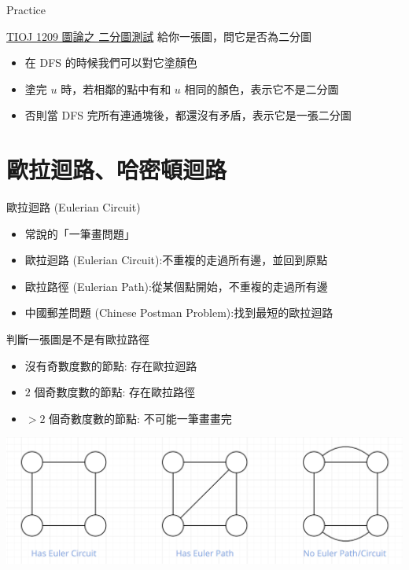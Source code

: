 \documentclass[aspectratio=169]{beamer}
\begin{document}
    \begin{frame}{Practice}
        \begin{block}{\href{https://tioj.ck.tp.edu.tw/problems/1209}{TIOJ 1209 圖論之 二分圖測試}}
        給你一張圖，問它是否為二分圖
        \end{block}
        \begin{itemize}
            \item<2-> 在 DFS 的時候我們可以對它塗顏色
            \item<3-> 塗完 $u$ 時，若相鄰的點中有和 $u$ 相同的顏色，表示它不是二分圖
            \item<4-> 否則當 DFS 完所有連通塊後，都還沒有矛盾，表示它是一張二分圖
        \end{itemize}
    \end{frame}
    
    \section{歐拉迴路、哈密頓迴路}
    \begin{frame}{歐拉迴路 (Eulerian Circuit)}
        \begin{itemize}
            \item 常說的「一筆畫問題」
            \item 歐拉迴路 (Eulerian Circuit):不重複的走過所有邊，並回到原點
            \item 歐拉路徑 (Eulerian Path):從某個點開始，不重複的走過所有邊
            \item 中國郵差問題 (Chinese Postman Problem):找到最短的歐拉迴路
        \end{itemize}
    \end{frame}
    
    \begin{frame}{判斷一張圖是不是有歐拉路徑}
        \begin{itemize}
            \item 沒有奇數度數的節點: 存在歐拉迴路
            \item $2$ 個奇數度數的節點: 存在歐拉路徑
            \item $>2$ 個奇數度數的節點: 不可能一筆畫畫完
        \end{itemize}
        \begin{center}
            \includegraphics[width=\textwidth]{images/eulerian_graph.png}
        \end{center}
    \end{frame}
    
\end{document}
